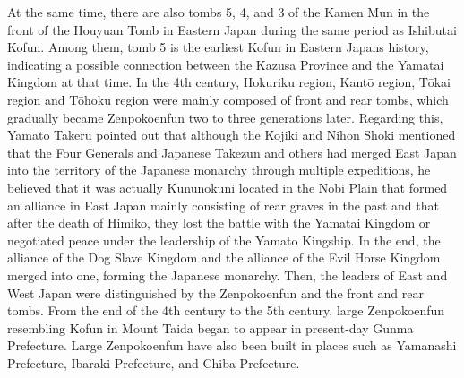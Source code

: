 \begin{tcolorbox}[breakable, colback=white, colframe=black!80,
  boxrule=0.6pt, arc=0mm, left=3mm, right=3mm, top=2mm, bottom=2mm]
\medskip
At the same time, there are also tombs 5, 4, and 3 of the Kamen Mun in the front of the Houyuan Tomb in Eastern Japan during the same period as Ishibutai Kofun. Among them, tomb 5 is the earliest Kofun in Eastern Japan\textquotesingle{}s history, indicating a possible connection between the Kazusa Province and the Yamatai Kingdom at that time. In the 4th century, Hokuriku region, Kantō region, Tōkai region and Tōhoku region were mainly composed of front and rear tombs, which gradually became Zenpokoenfun two to three generations later. Regarding this, Yamato Takeru pointed out that although the \textquotedbl{}Kojiki\textquotedbl{} and \textquotedbl{}Nihon Shoki\textquotedbl{} mentioned that the Four Generals and Japanese Takezun and others had merged East Japan into the territory of the Japanese monarchy through multiple expeditions, he believed that it was actually Kununokuni located in the Nōbi Plain that formed an alliance in East Japan mainly consisting of rear graves in the past and that after the death of Himiko, they lost the battle with the Yamatai Kingdom or negotiated peace under the leadership of the Yamato Kingship. In the end, the alliance of the Dog Slave Kingdom and the alliance of the Evil Horse Kingdom merged into one, forming the Japanese monarchy. Then, the leaders of East and West Japan were distinguished by the Zenpokoenfun and the front and rear tombs. From the end of the 4th century to the 5th century, large Zenpokoenfun resembling Kofun in Mount Taida began to appear in present-{}day Gunma Prefecture. Large Zenpokoenfun have also been built in places such as Yamanashi Prefecture, Ibaraki Prefecture, and Chiba Prefecture.\par
\medskip

\end{tcolorbox}
